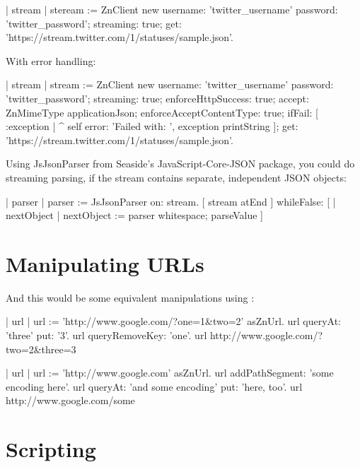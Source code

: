 \documentclass[a4paper,10pt,twoside]{book}
\begin{document}
\begin{code}
| stream |
steream := ZnClient new
	username: 'twitter_username' password: 'twitter_password';
	streaming: true;
	get: 'https://stream.twitter.com/1/statuses/sample.json'.
\end{code}

With error handling:

\begin{code}
| stream |
stream := ZnClient new
	username: 'twitter_username' password: 'twitter_password';
	streaming: true;
	enforceHttpSuccess: true; 
	accept: ZnMimeType applicationJson;
	enforceAcceptContentType: true; 
	ifFail: [ :exception | ^ self error: 'Failed with: ', exception printString ]; 
	get: 'https://stream.twitter.com/1/statuses/sample.json'.
\end{code}

Using JsJsonParser from Seaside's JavaScript-Core-JSON package, you could do streaming parsing, if the stream contains separate, independent JSON objects:

\begin{code}
| parser |
parser := JsJsonParser on: stream.
[ stream atEnd ] whileFalse: [ | nextObject |
	nextObject := parser whitespace; parseValue ]
\end{code}





\section{Manipulating URLs}

And this would be some equivalent manipulations using :

\begin{code}{}
| url |
url := 'http://www.google.com/?one=1&two=2' asZnUrl.
url queryAt: 'three' put: '3'.
url queryRemoveKey: 'one'.
url
\returns http://www.google.com/?two=2&three=3
\end{code}

\begin{code}{}
| url |
url := 'http://www.google.com' asZnUrl.
url addPathSegment: 'some encoding here'.
url queryAt: 'and some encoding' put: 'here, too'.
url 
http://www.google.com/some%
\end{code}



\section{Scripting}
\end{document}
